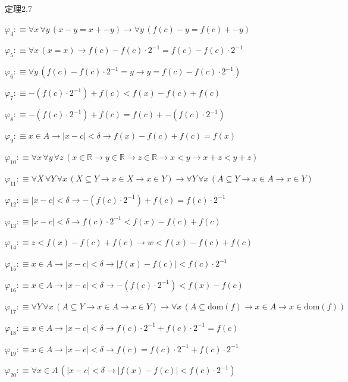 \begin{fullproof}{定理2.7}
\begin{abbrevlist}
\item $\varphi_{4} :\equiv \forall x\,\forall y\,(x - y = x + -y) \to \forall y\,(f(c) - y = f(c) + -y)$
\item $\varphi_{5} :\equiv \forall x\,(x = x) \to f(c) - f(c) \cdot 2^{-1} = f(c) - f(c) \cdot 2^{-1}$
\item $\varphi_{6} :\equiv \forall y\,(f(c) - f(c) \cdot 2^{-1} = y \to y = f(c) - f(c) \cdot 2^{-1})$
\item $\varphi_{7} :\equiv -(f(c) \cdot 2^{-1}) + f(c) < f(x) - f(c) + f(c)$
\item $\varphi_{8} :\equiv -(f(c) \cdot 2^{-1}) + f(c) = f(c) + -(f(c) \cdot 2^{-1})$
\item $\varphi_{9} :\equiv x \in A \to \lvert x - c \rvert < \delta \to f(x) - f(c) + f(c) = f(x)$
\item $\varphi_{10} :\equiv \forall x\,\forall y\,\forall z\,(x \in \mathbb{R} \to y \in \mathbb{R} \to z \in \mathbb{R} \to x < y \to x + z < y + z)$
\item $\varphi_{11} :\equiv \forall X\,\forall Y\,\forall x\,(X \subseteq Y \to x \in X \to x \in Y) \to \forall Y\,\forall x\,(A \subseteq Y \to x \in A \to x \in Y)$
\item $\varphi_{12} :\equiv \lvert x - c \rvert < \delta \to -(f(c) \cdot 2^{-1}) + f(c) = f(c) \cdot 2^{-1}$
\item $\varphi_{13} :\equiv \lvert x - c \rvert < \delta \to f(c) \cdot 2^{-1} < f(x) - f(c) + f(c)$
\item $\varphi_{14} :\equiv z < f(x) - f(c) + f(c) \to w < f(x) - f(c) + f(c)$
\item $\varphi_{15} :\equiv x \in A \to \lvert x - c \rvert < \delta \to \lvert f(x) - f(c) \rvert < f(c) \cdot 2^{-1}$
\item $\varphi_{16} :\equiv x \in A \to \lvert x - c \rvert < \delta \to -(f(c) \cdot 2^{-1}) < f(x) - f(c)$
\item $\varphi_{17} :\equiv \forall Y\,\forall x\,(A \subseteq Y \to x \in A \to x \in Y) \to \forall x\,(A \subseteq \mathrm{dom}(f) \to x \in A \to x \in \mathrm{dom}(f))$
\item $\varphi_{18} :\equiv x \in A \to \lvert x - c \rvert < \delta \to f(c) \cdot 2^{-1} + f(c) \cdot 2^{-1} = f(c)$
\item $\varphi_{19} :\equiv x \in A \to \lvert x - c \rvert < \delta \to f(c) = f(c) \cdot 2^{-1} + f(c) \cdot 2^{-1}$
\item $\varphi_{20} :\equiv \forall x \in A\,(\lvert x - c \rvert < \delta \to \lvert f(x) - f(c) \rvert < f(c) \cdot 2^{-1})$

\end{abbrevlist}
\end{fullproof}
